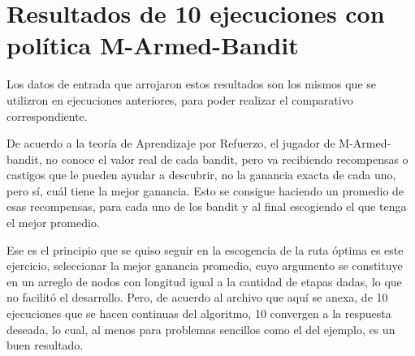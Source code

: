 \chapter{Resultados de 10 ejecuciones con política M-Armed-Bandit}
\label{resultBandit10}

Los datos de entrada que arrojaron estos resultados son los mismos que se utilizron en ejecuciones anteriores, para poder realizar el comparativo correspondiente.

De acuerdo a la teoría de Aprendizaje por Refuerzo, el jugador de M-Armed-bandit, no conoce el valor real de cada bandit, pero va recibiendo recompensas o castigos que le pueden ayudar a descubrir, no la ganancia exacta de cada uno, pero sí, cuál tiene la mejor ganancia. Esto se consigue haciendo un promedio de esas recompensas, para cada uno de los bandit y al final escogiendo el que tenga el mejor promedio.

Ese es el principio que se quiso seguir en la escogencia de la ruta óptima es este ejercicio, seleccionar la mejor ganancia promedio, cuyo argumento se constituye en un arreglo de nodos con longitud igual a la cantidad de etapas dadas, lo que no facilitó el desarrollo. Pero, de acuerdo al archivo que aquí se anexa, de 10 ejecuciones que se hacen continuas del algoritmo, 10 convergen a la respuesta deseada, lo cual, al menos para problemas sencillos como el del ejemplo, es un buen resultado.

